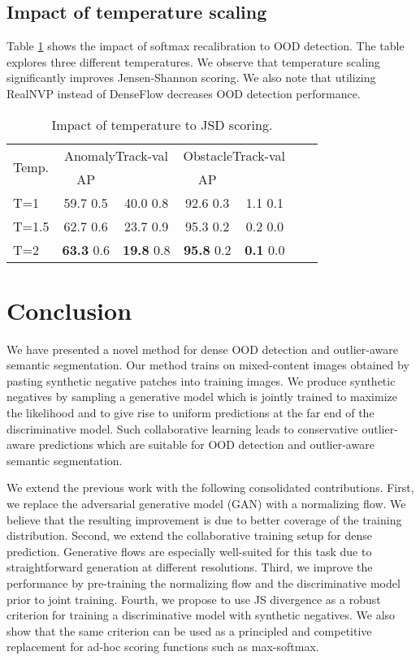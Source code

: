 \documentclass[lettersize,journal,hidelinks]{IEEEtran}
\begin{document}
\subsection{Impact of temperature scaling}
Table \ref{tbl:abl-temp} shows the impact of softmax recalibration to OOD detection.
The table explores three different temperatures.
We observe that temperature scaling significantly improves Jensen-Shannon scoring.
We also note that utilizing RealNVP \cite{dinh17iclr} instead of DenseFlow \cite{grcic21neurips} decreases OOD detection performance.

\begin{table}[ht]
\centering
\caption{Impact of temperature to JSD scoring.}
\label{tbl:abl-temp}
\begin{footnotesize}
\begin{tabular}{l|cccccc}
\hline \hline
 \multirow{2}{*}{Temp.} & \multicolumn{2}{c|}{AnomalyTrack-val} & \multicolumn{2}{c}{ObstacleTrack-val}\\
   &  \multicolumn{1}{c}{AP} & \multicolumn{1}{c|}{} & AP & \multicolumn{1}{c}{}\\ \hline \hline
 T=1 & 59.7  0.5& 40.0  0.8& 92.6   0.3& 1.1  0.1\\
 T=1.5 & 62.7  0.6& 23.7  0.9&95.3  0.2& 0.2  0.0\\
 T=2 & \textbf{63.3}  0.6& \textbf{19.8}  0.8& \textbf{95.8}  0.2& \textbf{0.1}  0.0\\
\hline
\end{tabular}
\end{footnotesize}
\end{table}

\section{Conclusion}
We have presented a novel method for dense OOD detection and  outlier-aware semantic segmentation. 
Our method trains on mixed-content images obtained by pasting synthetic negative patches into training images.
We produce synthetic negatives 
by sampling a generative model 
which is  jointly trained
to maximize the likelihood
and to give rise to uniform predictions at the far end of the discriminative model.
Such collaborative learning leads to conservative outlier-aware predictions which are suitable for OOD detection and  outlier-aware semantic segmentation.

We extend the previous work with the following consolidated contributions.
First, we replace the adversarial generative model (GAN) with a normalizing flow.
We believe that the resulting improvement is due to better coverage of the training distribution.
Second, we extend the collaborative training setup for dense prediction.
Generative flows are especially well-suited for this task due to straightforward generation at different resolutions.
Third, we improve the performance by pre-training the normalizing flow and the discriminative model 
prior to joint training. 
Fourth, we propose to use JS divergence as a robust criterion for training a discriminative model with synthetic negatives.
We also show that the same criterion can be used as a principled and competitive replacement for ad-hoc scoring functions such as max-softmax. 
\end{document}
